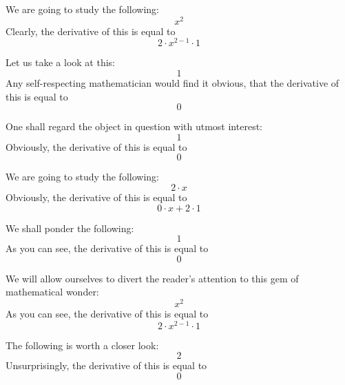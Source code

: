 \documentclass{article}
\begin{document}
We are going to study the following:
\begin{equation}
x ^{2 } 
\end{equation}
Clearly, the derivative of this is equal to
\begin{equation}
2 \cdot x ^{2 - 1 } \cdot 1 
\end{equation}

Let us take a look at this:
\begin{equation}
1 
\end{equation}
Any self-respecting mathematician would find it obvious, that the derivative of this is equal to
\begin{equation}
0 
\end{equation}

One shall regard the object in question with utmost interest:
\begin{equation}
1 
\end{equation}
Obviously, the derivative of this is equal to
\begin{equation}
0 
\end{equation}

We are going to study the following:
\begin{equation}
2 \cdot x 
\end{equation}
Obviously, the derivative of this is equal to
\begin{equation}
0 \cdot x + 2 \cdot 1 
\end{equation}

We shall ponder the following:
\begin{equation}
1 
\end{equation}
As you can see, the derivative of this is equal to
\begin{equation}
0 
\end{equation}

We will allow ourselves to divert the reader's attention to this gem of mathematical wonder:
\begin{equation}
x ^{2 } 
\end{equation}
As you can see, the derivative of this is equal to
\begin{equation}
2 \cdot x ^{2 - 1 } \cdot 1 
\end{equation}

The following is worth a closer look:
\begin{equation}
2 
\end{equation}
Unsurprisingly, the derivative of this is equal to
\begin{equation}
0 
\end{equation}
\end{document}
